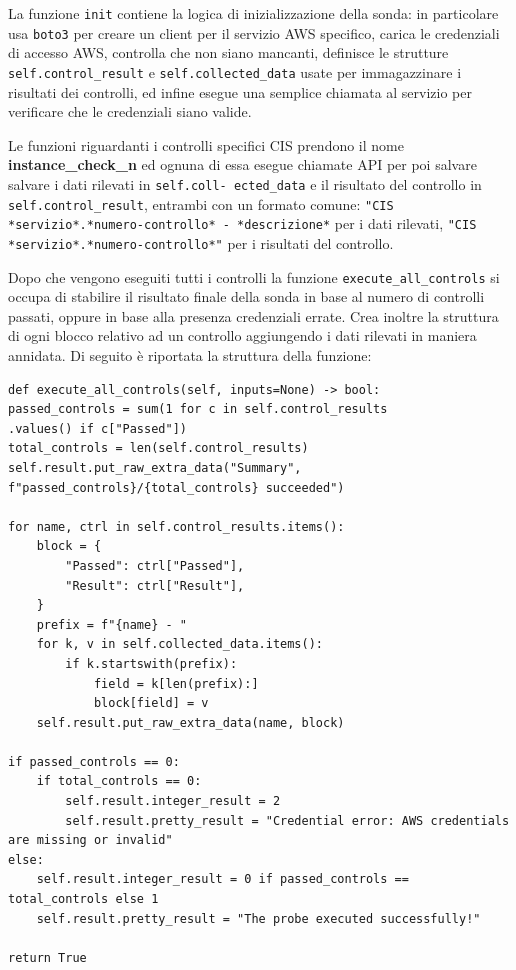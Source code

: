 La funzione \texttt{init} contiene la logica di inizializzazione della sonda: in particolare usa \texttt{boto3} per creare un client per il servizio AWS specifico, carica le credenziali di accesso AWS, controlla che non siano mancanti, definisce le strutture \texttt{self.control\_result} e \texttt{self.collected\_data} usate per immagazzinare i risultati dei controlli, ed infine esegue una semplice chiamata al servizio per verificare che le credenziali siano valide.

Le funzioni riguardanti i controlli specifici CIS prendono il nome \textbf{instance\_check\_n} ed ognuna di essa esegue chiamate API per poi salvare salvare i dati rilevati in \texttt{self.coll-
ected\_data} e il risultato del controllo in \texttt{self.control\_result}, entrambi con un formato comune: 
\texttt{"CIS *servizio*.*numero-controllo* - *descrizione*} per i dati rilevati, \texttt{"CIS *servizio*.*numero-controllo*"} per i risultati del controllo.

Dopo che vengono eseguiti tutti i controlli la funzione \texttt{execute\_all\_controls} si occupa di stabilire il risultato finale della sonda in base al numero di controlli passati, oppure in base alla presenza credenziali errate. Crea inoltre la struttura di ogni blocco relativo ad un controllo aggiungendo i dati rilevati in maniera annidata. Di seguito è riportata la struttura della funzione:

\begin{lstlisting}[style=mypython, caption={Funzione \texttt{execute\_all\_controls} per la gestione dei risultati della sonda}]
def execute_all_controls(self, inputs=None) -> bool:
passed_controls = sum(1 for c in self.control_results
.values() if c["Passed"])
total_controls = len(self.control_results)
self.result.put_raw_extra_data("Summary",
f"passed_controls}/{total_controls} succeeded")

for name, ctrl in self.control_results.items():
    block = {
        "Passed": ctrl["Passed"],
        "Result": ctrl["Result"],
    }
    prefix = f"{name} - "
    for k, v in self.collected_data.items():
        if k.startswith(prefix):
            field = k[len(prefix):]
            block[field] = v
    self.result.put_raw_extra_data(name, block)

if passed_controls == 0:
    if total_controls == 0:
        self.result.integer_result = 2
        self.result.pretty_result = "Credential error: AWS credentials are missing or invalid"
else:
    self.result.integer_result = 0 if passed_controls == total_controls else 1
    self.result.pretty_result = "The probe executed successfully!"

return True
\end{lstlisting}

